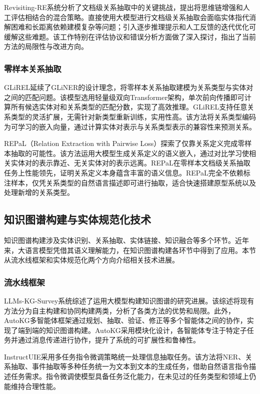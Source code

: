 Revisiting-RE系统分析了文档级关系抽取中的关键挑战\cite{revisiting_re_2023}，提出将思维链增强和人工评估相结合的混合策略。直接使用大模型进行文档级关系抽取会面临实体指代消解困难和长距离依赖建模复杂等问题；引入逐步推理提示和人工反馈的迭代优化可缓解这些难题。该工作特别在评估协议和错误分析方面做了深入探讨，指出了当前方法的局限性与改进方向。

\subsubsection{零样本关系抽取}

GLiREL延续了GLiNER的设计理念，将零样本关系抽取建模为关系类型与实体对之间的匹配问题\cite{glirel_2025}。该模型选用轻量级双向Transformer架构，单次前向传播即可计算所有候选实体对和关系类型的匹配分数，实现了高效推理。GLiREL支持任意关系类型的灵活扩展，无需针对新类型重新训练，实用性高。该方法将关系类型编码为可学习的嵌入向量，通过计算实体对表示与关系类型表示的兼容性来预测关系。

REPaL（Relation Extraction with Pairwise Loss）探索了仅靠关系定义完成零样本抽取的可能性\cite{repal_2024}。该方法运用大模型生成关系定义的语义嵌入，通过对比学习使相关实体对的表示靠近、无关实体对的表示远离。REPaL在零样本文档级关系抽取任务上性能领先，证明关系定义本身蕴含丰富的语义信息。REPaL完全不依赖标注样本，仅凭关系类型的自然语言描述即可进行抽取，适合快速搭建原型系统以及处理新增的关系类型。

\subsection{知识图谱构建与实体规范化技术}

知识图谱构建涉及实体识别、关系抽取、实体链接、知识融合等多个环节。近年来，大语言模型凭借其语义理解能力，在知识图谱构建各环节中得到了应用。本节从流水线框架和实体规范化两个方向介绍相关技术进展\cite{zhaojun2018,wanghaofen2019}。

\subsubsection{流水线框架}

LLMs-KG-Survey系统综述了运用大模型构建知识图谱的研究进展\cite{llms_kg_survey_2023}。该综述将现有方法分为自主构建和协同构建两类，分析了各类方法的优势和局限。此外，AutoKG多智能体框架通过规划、抽取、验证、修正等多个智能体之间的协作，实现了端到端的知识图谱构建。AutoKG采用模块化设计，各智能体专注于特定子任务并通过消息传递进行协作，提升了系统的可扩展性和鲁棒性。

InstructUIE采用多任务指令微调策略统一处理信息抽取任务\cite{instructuie_2023}。该方法将NER、关系抽取、事件抽取等多种任务统一为文本到文本的生成任务，借助自然语言指令描述任务需求。指令微调使模型具备任务泛化能力，在未见过的任务类型和领域上仍能维持合理性能。

